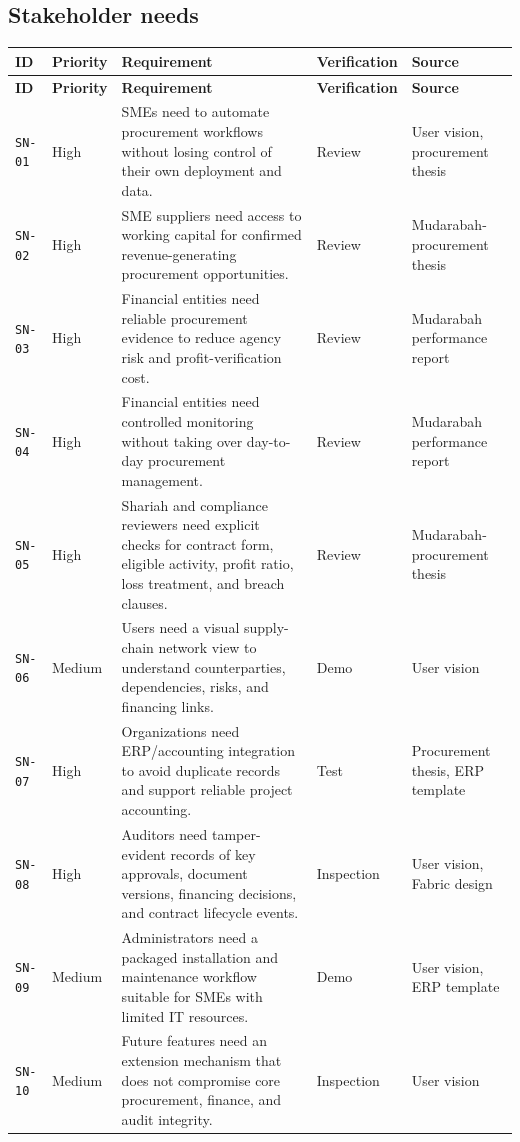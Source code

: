 \documentclass[11pt,a4paper]{article}
\begin{document}
\subsection{Stakeholder needs}\label{sec:stakeholder-needs}
\begin{footnotesize}
\begin{longtable}{@{}p{}p{}p{}p{}p{}@{}}
\rowcolor{gray!18}\textbf{ID} & \textbf{Priority} & \textbf{Requirement} & \textbf{Verification} & \textbf{Source} \\ \hline
\endfirsthead
\rowcolor{gray!18}\textbf{ID} & \textbf{Priority} & \textbf{Requirement} & \textbf{Verification} & \textbf{Source} \\ \hline
\endhead
\texttt{SN-01} & High & SMEs need to automate procurement workflows without losing control of their own deployment and data. & Review & User vision, procurement thesis \\ \hline
\texttt{SN-02} & High & SME suppliers need access to working capital for confirmed revenue-generating procurement opportunities. & Review & Mudarabah-procurement thesis \\ \hline
\texttt{SN-03} & High & Financial entities need reliable procurement evidence to reduce agency risk and profit-verification cost. & Review & Mudarabah performance report \\ \hline
\texttt{SN-04} & High & Financial entities need controlled monitoring without taking over day-to-day procurement management. & Review & Mudarabah performance report \\ \hline
\texttt{SN-05} & High & Shariah and compliance reviewers need explicit checks for contract form, eligible activity, profit ratio, loss treatment, and breach clauses. & Review & Mudarabah-procurement thesis \\ \hline
\texttt{SN-06} & Medium & Users need a visual supply-chain network view to understand counterparties, dependencies, risks, and financing links. & Demo & User vision \\ \hline
\texttt{SN-07} & High & Organizations need ERP/accounting integration to avoid duplicate records and support reliable project accounting. & Test & Procurement thesis, ERP template \\ \hline
\texttt{SN-08} & High & Auditors need tamper-evident records of key approvals, document versions, financing decisions, and contract lifecycle events. & Inspection & User vision, Fabric design \\ \hline
\texttt{SN-09} & Medium & Administrators need a packaged installation and maintenance workflow suitable for SMEs with limited IT resources. & Demo & User vision, ERP template \\ \hline
\texttt{SN-10} & Medium & Future features need an extension mechanism that does not compromise core procurement, finance, and audit integrity. & Inspection & User vision \\ \hline
\end{longtable}
\end{footnotesize}
\end{document}
